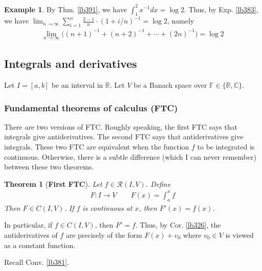 \documentclass[12pt,b5paper,notitlepage]{article}
\theoremstyle{definition}
\newtheorem{eg}[df]{Example}
\theoremstyle{plain}
\newtheorem{thm}[df]{Theorem}
\newcommand{\scr}{\mathscr}
\newcommand{\Cbb}{\mathbb C}
\newcommand{\Rbb}{\mathbb R}
\newcommand{\Fbb}{\mathbb F}
\numberwithin{equation}{section}
\begin{document}
\begin{eg}
By Thm. \ref{lb391}, we have $\int_1^2x^{-1}dx=\log 2$. Thus, by Exp. \ref{lb383}, we have $\lim_{n\rightarrow\infty}\sum_{i=1}^n\frac{2-1}{n}\cdot (1+i/n)^{-1}=\log 2$, namely
\begin{align*}
\lim_{n\rightarrow\infty}\big((n+1)^{-1}+(n+2)^{-1}+\cdots+(2n)^{-1} \big)=\log 2
\end{align*}
\end{eg}








\subsection{Integrals and derivatives}




Let $I=[a,b]$ be an interval in $\Rbb$. Let $V$ be a Banach space over $\Fbb\in\{\Rbb,\Cbb\}$.


\subsubsection{Fundamental theorems of calculus (FTC)} 


There are two versions of FTC. Roughly speaking, the first FTC says that integrals give antiderivatives. The second FTC says that antiderivatives give integrals. These two FTC are equivalent when the function $f$ to be integrated is continuous. Otherwise, there is a subtle difference (which I can never remember) between these two theorems. 


\begin{thm}[\textbf{First FTC}]\label{lb390}
Let $f\in\scr R(I,V)$. Define
\begin{gather}
F:I\rightarrow V\qquad F(x)=\int_a^x f
\end{gather}
Then $F\in C(I,V)$. If $f$ is continuous at $x$, then $F'(x)=f(x)$.
\end{thm}

In particular, if $f\in C(I,V)$, then $F'=f$. Thus, by Cor. \ref{lb326}, the antiderivatives of $f$ are precisely of the form $F(x)+v_0$ where $v_0\in V$ is viewed as a constant function. 


Recall Conv. \ref{lb381}.
\end{document}
